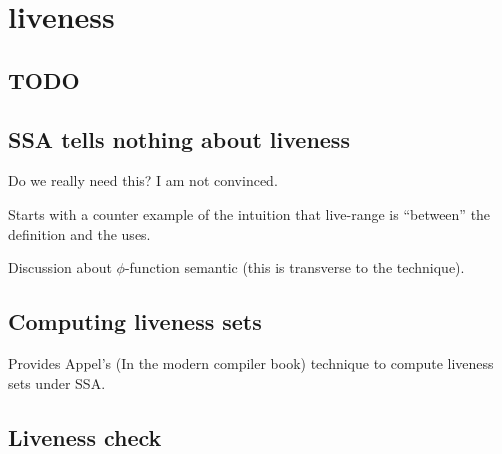 \applynumberofpages\chapter{liveness }
\section{TODO}

\section{SSA tells nothing about liveness}
Do we really need this? I am not convinced.

Starts with a counter example of the intuition that live-range is ``between'' the definition and the uses. 

Discussion about $\phi$-function semantic (this is transverse to the technique).

\section{Computing liveness sets}
Provides Appel's (In the modern compiler book) technique to compute liveness sets under SSA.

\section{Liveness check}
